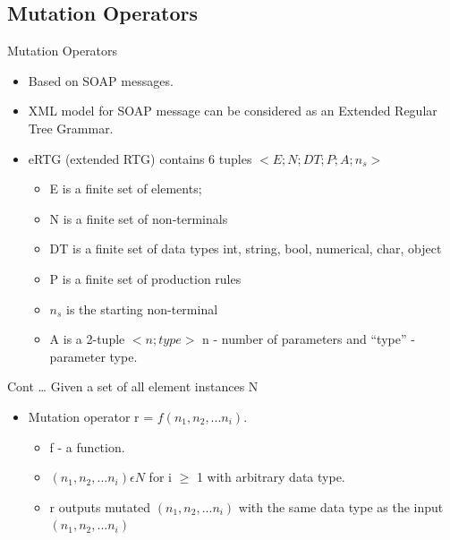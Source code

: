 \documentclass{bredelebeamer}
\begin{document}
\subsection{Mutation Operators}
\begin{frame}{Mutation Operators}
	\begin{itemize}
		\large
		\item Based on SOAP messages.
		\newline
		\item XML model for SOAP message can be considered as an Extended Regular Tree Grammar. 
		\newline
		\item eRTG (extended RTG) contains 6 tuples  $ < E; N; DT; P; A; n_{s} >  $
		\begin{itemize}
			\large
			\item E is a finite set of elements;
			\item N is a finite set of non-terminals
			\item DT is a finite set of data types {int, string, bool, numerical, char, object}
			\item P is a finite set of production rules
			\item $ n_{s} $ is the starting non-terminal
			\item A is a 2-tuple $ < n; type > $  n - number of parameters and ``type” - parameter type.
		\end{itemize}
	\end{itemize}
\end{frame}

\begin{frame}{Cont \dots}
	\large
	Given a set of all element instances N
	\newline
	\begin{itemize}
		\large
		\item Mutation operator r = $ f(n_{1}, n_{2}, ...n_{i}) $.
		\newline
		\begin{itemize}
			\large
			\item f - a function.
			\newline
			\item $ (n_{1}, n_{2}, ...n_{i}) \epsilon N  $ for i $ \geq $ 1 with arbitrary data type. 
			\newline
			\item r outputs mutated  $ (n_{1}, n_{2}, ...n_{i})$ with the same data type as the input  $ (n_{1}, n_{2}, ...n_{i})$
			\newline
		\end{itemize}
	\end{itemize}
\end{frame}
\end{document}
